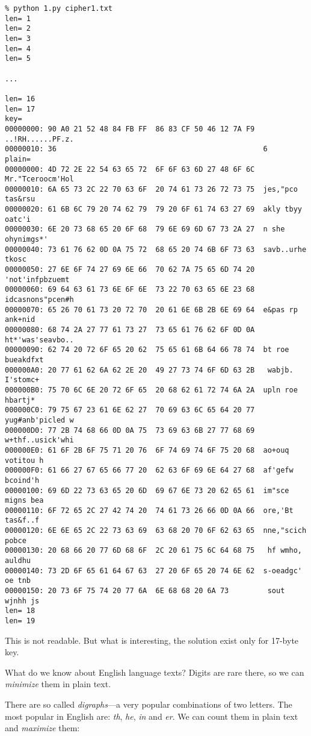 \begin{lstlisting}
% python 1.py cipher1.txt
len= 1
len= 2
len= 3
len= 4
len= 5

...

len= 16
len= 17
key=
00000000: 90 A0 21 52 48 84 FB FF  86 83 CF 50 46 12 7A F9  ..!RH......PF.z.
00000010: 36                                                6
plain=
00000000: 4D 72 2E 22 54 63 65 72  6F 6F 63 6D 27 48 6F 6C  Mr."Tceroocm'Hol
00000010: 6A 65 73 2C 22 70 63 6F  20 74 61 73 26 72 73 75  jes,"pco tas&rsu
00000020: 61 6B 6C 79 20 74 62 79  79 20 6F 61 74 63 27 69  akly tbyy oatc'i
00000030: 6E 20 73 68 65 20 6F 68  79 6E 69 6D 67 73 2A 27  n she ohynimgs*'
00000040: 73 61 76 62 0D 0A 75 72  68 65 20 74 6B 6F 73 63  savb..urhe tkosc
00000050: 27 6E 6F 74 27 69 6E 66  70 62 7A 75 65 6D 74 20  'not'infpbzuemt
00000060: 69 64 63 61 73 6E 6F 6E  73 22 70 63 65 6E 23 68  idcasnons"pcen#h
00000070: 65 26 70 61 73 20 72 70  20 61 6E 6B 2B 6E 69 64  e&pas rp ank+nid
00000080: 68 74 2A 27 77 61 73 27  73 65 61 76 62 6F 0D 0A  ht*'was'seavbo..
00000090: 62 74 20 72 6F 65 20 62  75 65 61 6B 64 66 78 74  bt roe bueakdfxt
000000A0: 20 77 61 62 6A 62 2E 20  49 27 73 74 6F 6D 63 2B   wabjb. I'stomc+
000000B0: 75 70 6C 6E 20 72 6F 65  20 68 62 61 72 74 6A 2A  upln roe hbartj*
000000C0: 79 75 67 23 61 6E 62 27  70 69 63 6C 65 64 20 77  yug#anb'picled w
000000D0: 77 2B 74 68 66 0D 0A 75  73 69 63 6B 27 77 68 69  w+thf..usick'whi
000000E0: 61 6F 2B 6F 75 71 20 76  6F 74 69 74 6F 75 20 68  ao+ouq votitou h
000000F0: 61 66 27 67 65 66 77 20  62 63 6F 69 6E 64 27 68  af'gefw bcoind'h
00000100: 69 6D 22 73 63 65 20 6D  69 67 6E 73 20 62 65 61  im"sce migns bea
00000110: 6F 72 65 2C 27 42 74 20  74 61 73 26 66 0D 0A 66  ore,'Bt tas&f..f
00000120: 6E 6E 65 2C 22 73 63 69  63 68 20 70 6F 62 63 65  nne,"scich pobce
00000130: 20 68 66 20 77 6D 68 6F  2C 20 61 75 6C 64 68 75   hf wmho, auldhu
00000140: 73 2D 6F 65 61 64 67 63  27 20 6F 65 20 74 6E 62  s-oeadgc' oe tnb
00000150: 20 73 6F 75 74 20 77 6A  6E 68 68 20 6A 73         sout wjnhh js
len= 18
len= 19
\end{lstlisting}

This is not readable. But what is interesting, the solution exist only for 17-byte key.

What do we know about English language texts?
Digits are rare there, so we can \textit{minimize} them in plain text.

There are so called \textit{digraphs}---a very popular combinations of two letters.
The most popular in English are: \textit{th}, \textit{he}, \textit{in} and \textit{er}.
We can count them in plain text and \textit{maximize} them:


